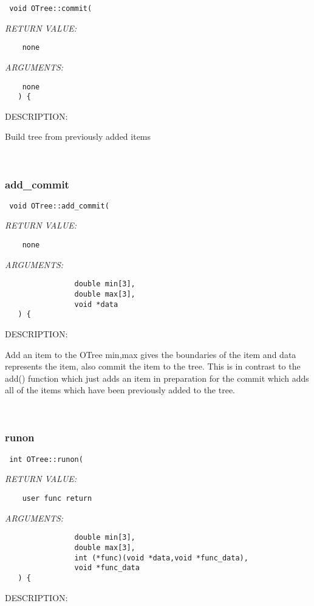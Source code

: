   
\begin{verbatim} void OTree::commit(
 \end{verbatim}{\em RETURN VALUE:}
\begin{verbatim}    none\end{verbatim}{\em ARGUMENTS:}
\begin{verbatim}    none
   ) {\end{verbatim}
{\sf DESCRIPTION:\\ }


   Build tree from previously added items 
 
\mbox{}\hrulefill\ 
 
\subsubsection [add\_commit] {add\_commit}


  
\begin{verbatim} void OTree::add_commit(
 \end{verbatim}{\em RETURN VALUE:}
\begin{verbatim}    none\end{verbatim}{\em ARGUMENTS:}
\begin{verbatim}                double min[3],
                double max[3],
                void *data
   ) {\end{verbatim}
{\sf DESCRIPTION:\\ }


   Add an item to the OTree min,max gives the boundaries of the item and data
   represents the item, also commit the item to the tree. This is in contrast
   to the add() function which just adds an item in preparation for the commit
   which adds all of the items which have been previously added to the tree. 
 
\mbox{}\hrulefill\ 
 
\subsubsection [runon] {runon}


  
\begin{verbatim} int OTree::runon(
 \end{verbatim}{\em RETURN VALUE:}
\begin{verbatim}    user func return\end{verbatim}{\em ARGUMENTS:}
\begin{verbatim}                double min[3],
                double max[3],
                int (*func)(void *data,void *func_data),
                void *func_data
   ) {\end{verbatim}
{\sf DESCRIPTION:\\ }


